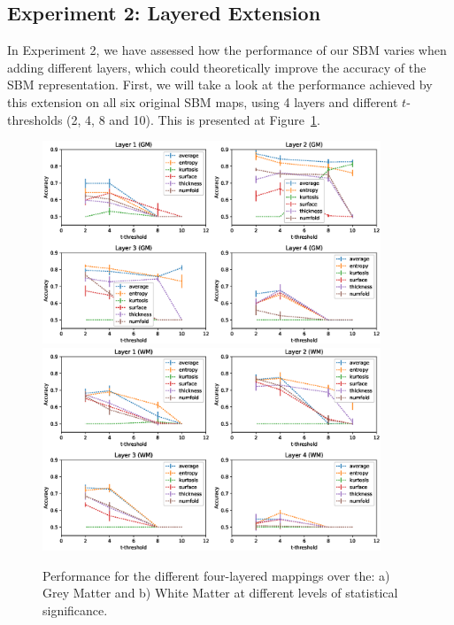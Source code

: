 \subsection{Experiment 2: Layered Extension}\label{sec:layeredttest}
In Experiment 2, we have assessed how the performance of our \ac{SBM} varies when adding different layers, which could theoretically improve the accuracy of the \ac{SBM} representation. First, we will take a look at the performance achieved by this extension on all six original \ac{SBM} maps, using 4 layers and different $t$-thresholds (2, 4, 8 and 10). This is presented at Figure~\ref{fig:layeredPerf}. 

\begin{figure}[htp]
	\centering
	\includegraphics[width=0.9\textwidth]{Graphics/ch6/layerPerfGM}\\
	\includegraphics[width=0.9\textwidth]{Graphics/ch6/layerPerfWM}
	
	\caption[Performance of the four-layered mappings.]{Performance for the different four-layered mappings over the: a) Grey Matter and b) White Matter at different levels of statistical significance.}
	\label{fig:layeredPerf}
\end{figure}

